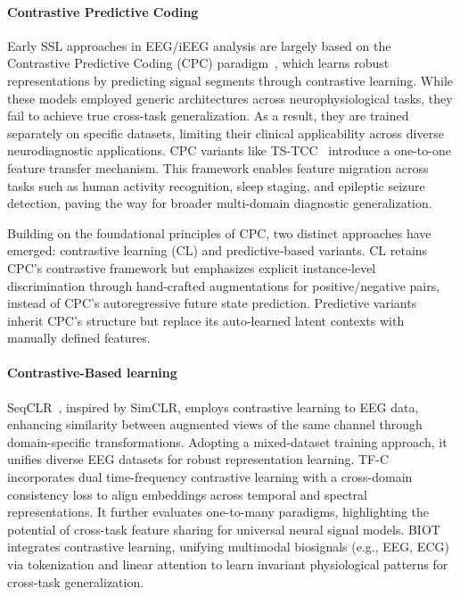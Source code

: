 \paragraph{Contrastive Predictive Coding}
Early SSL approaches in EEG/iEEG analysis are largely based on the Contrastive Predictive Coding (CPC) paradigm~\cite{banville2021uncovering,cai2023mbrain}, which learns robust representations by predicting signal segments through contrastive learning. While these models employed generic architectures across neurophysiological tasks, they fail to achieve true cross-task generalization. As a result, they are trained separately on specific datasets, limiting their clinical applicability across diverse neurodiagnostic applications.
CPC variants like TS-TCC~\cite{eldele2021time} introduce a one-to-one feature transfer mechanism. This framework enables feature migration across tasks such as human activity recognition, sleep staging, and epileptic seizure detection, paving the way for broader multi-domain diagnostic generalization.


Building on the foundational principles of CPC, two distinct approaches have emerged: contrastive learning (CL) and predictive-based variants. CL retains CPC’s contrastive framework but emphasizes explicit instance-level discrimination through hand-crafted augmentations for positive/negative pairs, instead of CPC’s autoregressive future state prediction.
Predictive variants inherit CPC’s structure but replace its auto-learned latent contexts with manually defined features.

\paragraph{Contrastive-Based learning}
SeqCLR~\cite{mohsenvand2020contrastive}, inspired by SimCLR, employs contrastive learning to EEG data, enhancing similarity between augmented views of the same channel through domain-specific transformations. Adopting a mixed-dataset training approach, it unifies diverse EEG datasets for robust representation learning.
TF-C~\cite{zhang2022self} incorporates dual time-frequency contrastive learning with a cross-domain consistency loss to align embeddings across temporal and spectral representations.
It further evaluates one-to-many paradigms, highlighting the potential of cross-task feature sharing for universal neural signal models.
BIOT~\cite{yang2024biot} integrates contrastive learning, unifying multimodal biosignals (e.g., EEG, ECG) via tokenization and linear attention to learn invariant physiological patterns for cross-task generalization.

